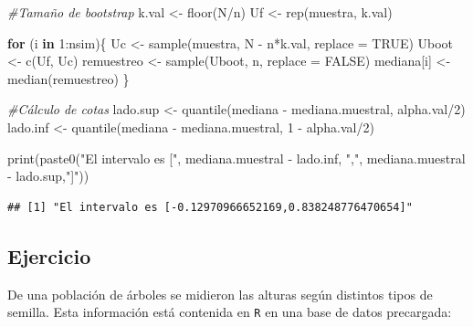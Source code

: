 \documentclass[
]{book}
\newenvironment{Shaded}{\begin{snugshade}}{\end{snugshade}}
\newcommand{\AttributeTok}[1]{\textcolor[rgb]{0.77,0.63,0.00}{#1}}
\newcommand{\CommentTok}[1]{\textcolor[rgb]{0.56,0.35,0.01}{\textit{#1}}}
\newcommand{\ConstantTok}[1]{\textcolor[rgb]{0.00,0.00,0.00}{#1}}
\newcommand{\ControlFlowTok}[1]{\textcolor[rgb]{0.13,0.29,0.53}{\textbf{#1}}}
\newcommand{\DecValTok}[1]{\textcolor[rgb]{0.00,0.00,0.81}{#1}}
\newcommand{\FunctionTok}[1]{\textcolor[rgb]{0.00,0.00,0.00}{#1}}
\newcommand{\NormalTok}[1]{#1}
\newcommand{\OtherTok}[1]{\textcolor[rgb]{0.56,0.35,0.01}{#1}}
\newcommand{\SpecialCharTok}[1]{\textcolor[rgb]{0.00,0.00,0.00}{#1}}
\newcommand{\StringTok}[1]{\textcolor[rgb]{0.31,0.60,0.02}{#1}}
\begin{document}
\begin{Shaded}
\begin{Highlighting}[]
\CommentTok{\#Tamaño de bootstrap}
\NormalTok{k.val }\OtherTok{\textless{}{-}} \FunctionTok{floor}\NormalTok{(N}\SpecialCharTok{/}\NormalTok{n)}
\NormalTok{Uf    }\OtherTok{\textless{}{-}} \FunctionTok{rep}\NormalTok{(muestra, k.val)}


\ControlFlowTok{for}\NormalTok{ (i }\ControlFlowTok{in} \DecValTok{1}\SpecialCharTok{:}\NormalTok{nsim)\{}
\NormalTok{  Uc         }\OtherTok{\textless{}{-}} \FunctionTok{sample}\NormalTok{(muestra, N }\SpecialCharTok{{-}}\NormalTok{ n}\SpecialCharTok{*}\NormalTok{k.val, }\AttributeTok{replace =} \ConstantTok{TRUE}\NormalTok{)}
\NormalTok{  Uboot      }\OtherTok{\textless{}{-}} \FunctionTok{c}\NormalTok{(Uf, Uc)}
\NormalTok{  remuestreo }\OtherTok{\textless{}{-}} \FunctionTok{sample}\NormalTok{(Uboot, n, }\AttributeTok{replace =} \ConstantTok{FALSE}\NormalTok{)}
\NormalTok{  mediana[i] }\OtherTok{\textless{}{-}} \FunctionTok{median}\NormalTok{(remuestreo)}
\NormalTok{\}}

\CommentTok{\#Cálculo de cotas}
\NormalTok{lado.sup }\OtherTok{\textless{}{-}} \FunctionTok{quantile}\NormalTok{(mediana }\SpecialCharTok{{-}}\NormalTok{ mediana.muestral, alpha.val}\SpecialCharTok{/}\DecValTok{2}\NormalTok{)}
\NormalTok{lado.inf }\OtherTok{\textless{}{-}} \FunctionTok{quantile}\NormalTok{(mediana }\SpecialCharTok{{-}}\NormalTok{ mediana.muestral, }\DecValTok{1} \SpecialCharTok{{-}}\NormalTok{ alpha.val}\SpecialCharTok{/}\DecValTok{2}\NormalTok{) }

\FunctionTok{print}\NormalTok{(}\FunctionTok{paste0}\NormalTok{(}\StringTok{"El intervalo es ["}\NormalTok{, mediana.muestral }\SpecialCharTok{{-}}\NormalTok{ lado.inf, }
             \StringTok{","}\NormalTok{, mediana.muestral }\SpecialCharTok{{-}}\NormalTok{ lado.sup,}\StringTok{"]"}\NormalTok{))}
\end{Highlighting}
\end{Shaded}

\begin{verbatim}
## [1] "El intervalo es [-0.12970966652169,0.838248776470654]"
\end{verbatim}

\hypertarget{ejercicio-10}{%
\subsection{Ejercicio}\label{ejercicio-10}}

De una población de árboles se midieron las alturas según distintos tipos de semilla. Esta información está contenida en \texttt{R} en una base de datos precargada:
\end{document}
